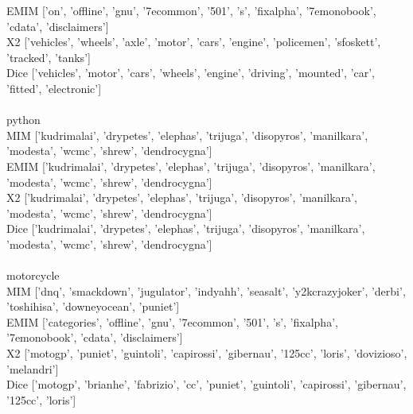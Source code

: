 \documentclass[10pt,letterpaper,bibliography=totoc]{scrartcl}
\begin{document}
  EMIM ['on', 'offline', 'gnu', '7ecommon', '501', 's', 'fixalpha', '7emonobook', 'cdata', 'disclaimers']\\
  X2   ['vehicles', 'wheels', 'axle', 'motor', 'cars', 'engine', 'policemen', 'sfoskett', 'tracked', 'tanks']\\
  Dice ['vehicles', 'motor', 'cars', 'wheels', 'engine', 'driving', 'mounted', 'car', 'fitted', 'electronic']\\\\
python\\
  MIM  ['kudrimalai', 'drypetes', 'elephas', 'trijuga', 'disopyros', 'manilkara', 'modesta', 'wcmc', 'shrew', 'dendrocygna']\\
  EMIM ['kudrimalai', 'drypetes', 'elephas', 'trijuga', 'disopyros', 'manilkara', 'modesta', 'wcmc', 'shrew', 'dendrocygna']\\
  X2   ['kudrimalai', 'drypetes', 'elephas', 'trijuga', 'disopyros', 'manilkara', 'modesta', 'wcmc', 'shrew', 'dendrocygna']\\
  Dice ['kudrimalai', 'drypetes', 'elephas', 'trijuga', 'disopyros', 'manilkara', 'modesta', 'wcmc', 'shrew', 'dendrocygna']\\\\
motorcycle\\
  MIM  ['dnq', 'smackdown', 'jugulator', 'indyahh', 'seasalt', 'y2kcrazyjoker', 'derbi', 'toshihisa', 'downeyocean', 'puniet']\\
  EMIM ['categories', 'offline', 'gnu', '7ecommon', '501', 's', 'fixalpha', '7emonobook', 'cdata', 'disclaimers']\\
  X2   ['motogp', 'puniet', 'guintoli', 'capirossi', 'gibernau', '125cc', 'loris', 'dovizioso', 'melandri']\\
  Dice ['motogp', 'brianhe', 'fabrizio', 'cc', 'puniet', 'guintoli', 'capirossi', 'gibernau', '125cc', 'loris']\\

\clearpage
\end{document}
